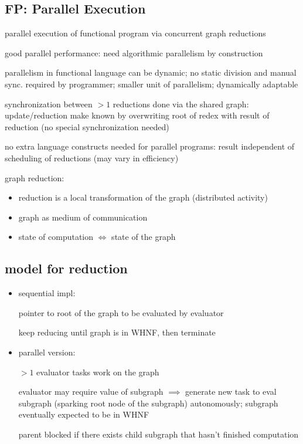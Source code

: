 \documentclass[8pt]{extarticle}
\begin{document}
\begin{multicols*}{2}
\vfill\null
\columnbreak

\section{FP: Parallel Execution}

parallel execution of functional program via concurrent graph reductions

good parallel performance: need algorithmic parallelism by construction

parallelism in functional language can be dynamic; no static division and manual sync. required by programmer; smaller unit of parallelism; dynamically adaptable

synchronization between $>1$ reductions done via the shared graph: update/reduction make known by overwriting root of redex with result of reduction (no special synchronization needed)

no extra language constructs needed for parallel programs: result independent of scheduling of reductions (may vary in efficiency)

graph reduction:
\begin{itemize}
\item reduction is a local transformation of the graph (distributed activity)
\item graph as medium of communication
\item state of computation $\iff$ state of the graph
\end{itemize}

\subsection{model for reduction}
\begin{itemize}
\item sequential impl:

  pointer to root of the graph to be evaluated by evaluator

  keep reducing until graph is in WHNF, then terminate

\item parallel version:

  $>1$ evaluator tasks work on the graph

  evaluator may require value of subgraph $\implies$ generate new task to eval subgraph (sparking root node of the subgraph) autonomously; subgraph eventually expected to be in WHNF

  parent blocked if there exists child subgraph that hasn't finished computation


\end{itemize}
\end{multicols*}
\end{document}
